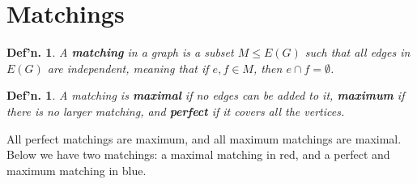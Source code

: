 \documentclass[12pt, a4paper]{book}
\newtheorem{definition}[theorem]{Def'n.}
\theoremstyle{nonumberplain}
\begin{document}
\section{Matchings}
\begin{definition}
    A \textbf{matching} in a graph is a subset $M\leq E(G)$ such that all edges in $E(G)$ are independent, meaning that if $e,f\in M$, then $e\cap f=\emptyset$.
\end{definition}
\begin{definition}
    A matching is \textbf{maximal} if no edges can be added to it, \textbf{maximum} if there is no larger matching, and \textbf{perfect} if it covers all the vertices.
\end{definition}
All perfect matchings are maximum, and all maximum matchings are maximal.
Below we have two matchings: a maximal matching in red, and a perfect and maximum matching in blue.
\begin{center}
\end{center}
\end{document}
